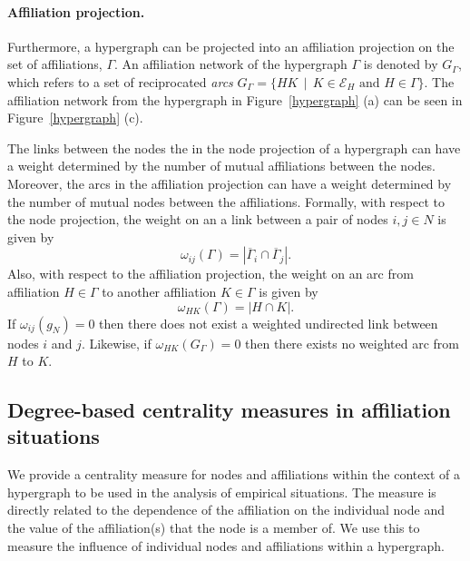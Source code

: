 \paragraph{Affiliation projection.}

Furthermore, a hypergraph can be projected into an affiliation projection on the set of affiliations, $\Gamma$. An affiliation network of the hypergraph $\Gamma$ is denoted by $G_{\Gamma}$, which refers to a set of reciprocated \emph{arcs} $G_{\Gamma} = \{ HK \, \mid \, K \in \mathcal{E}_{H} \mbox{ and } H \in \Gamma \}$. The affiliation network from the hypergraph in Figure~\ref{hypergraph} (a) can be seen in Figure~\ref{hypergraph} (c).

The links between the nodes the in the node projection of a hypergraph can have a weight determined by the number of mutual affiliations between the nodes. Moreover, the arcs in the affiliation projection can have a weight determined by the number of mutual nodes between the affiliations. Formally, with respect to the node projection, the weight on an a link between a pair of nodes $i,j \in N$ is given by
\begin{equation} \label{eq:nodeweight}
\omega_{ij}(\Gamma) = | \overline{\Gamma}_{i} \cap \overline{\Gamma}_{j} | .
\end{equation}
Also, with respect to the affiliation projection, the weight on an arc from affiliation $H \in \Gamma$ to another affiliation $K \in \Gamma$ is given by
\begin{equation} \label{eq:affweight}
\omega_{HK}(\Gamma) = | H \cap K | .
\end{equation}
If $\omega_{ij}(g_{N}) = 0$ then there does not exist a weighted undirected link between nodes $i$ and $j$. Likewise, if $\omega_{HK}(G_{\Gamma}) = 0$ then there exists no weighted arc from $H$ to $K$.

\subsection{Degree-based centrality measures in affiliation situations} 
\label{degreecentralities}

We provide a centrality measure for nodes and affiliations within the context of a hypergraph to be used in the analysis of empirical situations. The measure is directly related to the dependence of the affiliation on the individual node and the value of the affiliation(s) that the node is a member of. We use this to measure the influence of individual nodes and affiliations within a hypergraph.

